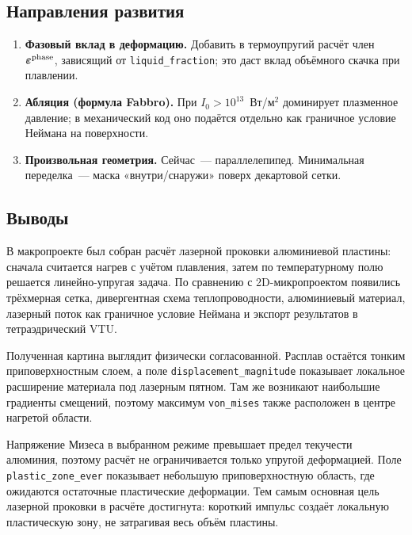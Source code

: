 \subsection{Направления развития}

\begin{enumerate}
  \item \textbf{Фазовый вклад в деформацию.}
        Добавить в термоупругий расчёт член
        $\boldsymbol{\varepsilon}^{\rm phase}$, зависящий от
        \texttt{liquid\_fraction}; это даст вклад объёмного скачка
        при плавлении.
  \item \textbf{Абляция (формула Fabbro).} При $I_0 > 10^{13}$~Вт/м$^2$
        доминирует плазменное давление; в механический код оно
        подаётся отдельно как граничное условие Неймана на поверхности.

  \item \textbf{Произвольная геометрия.} Сейчас~--- параллелепипед.
        Минимальная переделка~--- маска «внутри/снаружи» поверх
        декартовой сетки.

\end{enumerate}

\subsection{Выводы}

В макропроекте был собран расчёт лазерной проковки алюминиевой пластины:
сначала считается нагрев с учётом плавления, затем по температурному
полю решается линейно-упругая задача. По сравнению с 2D-микропроектом
появились трёхмерная сетка, дивергентная схема теплопроводности,
алюминиевый материал, лазерный поток как граничное условие Неймана и
экспорт результатов в тетраэдрический VTU.

Полученная картина выглядит физически согласованной. Расплав остаётся
тонким приповерхностным слоем, а поле \texttt{displacement\_magnitude}
показывает локальное расширение материала под лазерным пятном. Там же
возникают наибольшие градиенты смещений, поэтому максимум
\texttt{von\_mises} также расположен в центре нагретой области.

Напряжение Мизеса в выбранном режиме превышает предел текучести
алюминия, поэтому расчёт не ограничивается только упругой деформацией.
Поле \texttt{plastic\_zone\_ever} показывает небольшую приповерхностную
область, где ожидаются остаточные пластические деформации. Тем самым
основная цель лазерной проковки в расчёте достигнута: короткий импульс
создаёт локальную пластическую зону, не затрагивая весь объём пластины.
